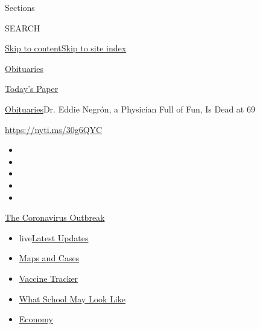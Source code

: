 Sections

SEARCH

\protect\hyperlink{site-content}{Skip to
content}\protect\hyperlink{site-index}{Skip to site index}

\href{https://www.nytimes.com/section/obituaries}{Obituaries}

\href{https://myaccount.nytimes.com/auth/login?response_type=cookie\&client_id=vi}{}

\href{https://www.nytimes.com/section/todayspaper}{Today's Paper}

\href{/section/obituaries}{Obituaries}\textbar{}Dr. Eddie Negrón, a
Physician Full of Fun, Is Dead at 69

\url{https://nyti.ms/30g6QYC}

\begin{itemize}
\item
\item
\item
\item
\item
\end{itemize}

\href{https://www.nytimes.com/news-event/coronavirus?action=click\&pgtype=Article\&state=default\&region=TOP_BANNER\&context=storylines_menu}{The
Coronavirus Outbreak}

\begin{itemize}
\tightlist
\item
  live\href{https://www.nytimes.com/2020/08/01/world/coronavirus-covid-19.html?action=click\&pgtype=Article\&state=default\&region=TOP_BANNER\&context=storylines_menu}{Latest
  Updates}
\item
  \href{https://www.nytimes.com/interactive/2020/us/coronavirus-us-cases.html?action=click\&pgtype=Article\&state=default\&region=TOP_BANNER\&context=storylines_menu}{Maps
  and Cases}
\item
  \href{https://www.nytimes.com/interactive/2020/science/coronavirus-vaccine-tracker.html?action=click\&pgtype=Article\&state=default\&region=TOP_BANNER\&context=storylines_menu}{Vaccine
  Tracker}
\item
  \href{https://www.nytimes.com/interactive/2020/07/29/us/schools-reopening-coronavirus.html?action=click\&pgtype=Article\&state=default\&region=TOP_BANNER\&context=storylines_menu}{What
  School May Look Like}
\item
  \href{https://www.nytimes.com/live/2020/07/31/business/stock-market-today-coronavirus?action=click\&pgtype=Article\&state=default\&region=TOP_BANNER\&context=storylines_menu}{Economy}
\end{itemize}

